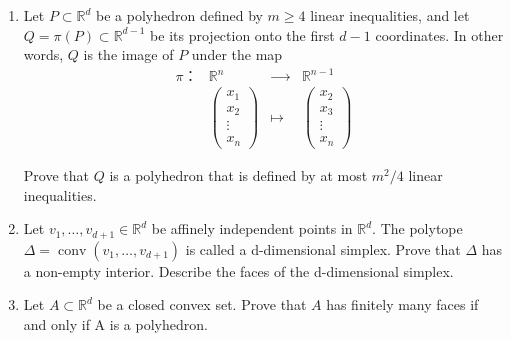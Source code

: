 \documentclass[11pt,a4paper]{article}
\renewcommand{\leq}{\leqslant}
\renewcommand{\geq}{\geqslant}
\DeclareMathOperator{\conv}{conv}
\begin{document}
\begin{enumerate}
  


\item Let $P ⊂ \mathbb{R}^d$ be a polyhedron defined by $m \geq 4$ linear inequalities, and let
  $Q = π(P) ⊂ \mathbb{R}^{d−1}$ be its projection onto the first $d-1$ coordinates. In other words, $Q$ is the image of $P$ under the map
  \begin{displaymath}
    \begin{array}{rrcll}
      π： & ℝ^n &⟶& ℝ^{n-1} \\
          & \left( 
            \begin{smallmatrix}
              x_1\\
               x_2\\
              \vdots\\
              x_n
            \end{smallmatrix} \right)  & \longmapsto & \left(\begin{smallmatrix}             
              x_2\\
              x_3 \\
              \vdots\\
              x_n
            \end{smallmatrix}  \right)
    \end{array}
  \end{displaymath}

  Prove that $Q$ is a polyhedron that is defined by at most $m^2/4$ linear inequalities.

\item Let $v_1, \hdots , v_{d+1} ∈ \mathbb{R}^d$ be affinely independent points in $\mathbb{R}^d$. The polytope $Δ = \conv (v_1 , \hdots , v_{d+1})$ is called a d-dimensional simplex. Prove that $Δ$ has a non-empty interior. Describe the faces of the d-dimensional simplex.

\item Let $A ⊂ \mathbb{R}^d$ be a closed convex set. Prove that $A$ has finitely many faces if and only if A is a polyhedron.




\end{enumerate}


%
%


 
\end{document}
